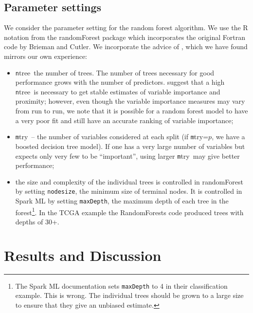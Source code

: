 \documentclass[10pt,letterpaper]{article}
\newcommand{\mtry}{{\texttt mtry}}
\newcommand{\ntree}{{\texttt ntree}}
\begin{document}
\subsection{Parameter settings}
We consider the parameter setting for the random forest algorithm. We use the R notation from the {\sc randomForest}
package \cite{Liaw.and.Weiner.2002} which incorporates the original Fortran code by Brieman and Cutler.  We incorporate
the advice of \cite{Liaw.and.Weiner.2002}, which we have found mirrors our own experience:
\begin{itemize}
\item \ntree\ the number of trees.  The number of trees necessary for good performance grows with the number of
  predictors.  \cite{Liaw.and.Weiner.2002} suggest that a high \ntree\ is necessary to get stable estimates of variable
  importance and proximity; however, even though the variable importance measures may vary from run to run, we note that
  it is possible for a random forest model to have a very poor fit and still have an accurate ranking of variable
  importance;
\item \mtry\ -- the number of variables considered at each split (if \mtry=$p$, we have a boosted decision
  tree model).  If one has a very large number of variables but expects only very few to be ``important'', using larger \mtry\ may give
  better performance;
\item the size and complexity of the individual trees is controlled in {\sc randomForest} by setting \texttt{nodesize}, the
  minimum size of terminal nodes. It is controlled in Spark ML by setting \texttt{maxDepth}, the maximum depth of each
  tree in the forest\footnote{The Spark ML documentation \cite[]{Spark.2016} sets \texttt{maxDepth}
    to 4 in their classification example. This is wrong. The
    individual trees should be grown to a large size to ensure that
    they give an unbiased estimate.}.
  In the TCGA example the RandomForests code produced trees with depths of 30+. 
\end{itemize}


%
%
\section{Results and Discussion}



\end{document}
